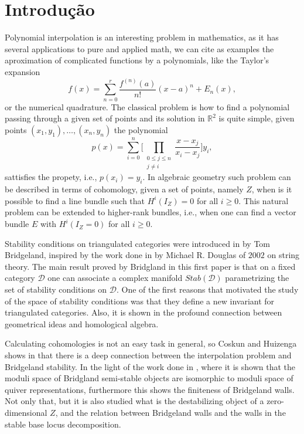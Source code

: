 \chapter*[Introdução]{Introdução}

Polynomial interpolation is an interesting problem in mathematics, as it has several applications to pure and applied math, we can cite as examples the aproximation of complicated functions by a polynomials, like the Taylor's expansion $$
f(x)=\sum_{n=0}^{r}\frac{f^{(n)}(a)}{n!}(x-a)^n+E_n(x),
$$ or the numerical quadrature. The classical problem is how to find a polynomial passing through a given set of points and its solution in $\mathbb R^2$ is quite simple, given points $(x_1,y_1),\dots,(x_n,y_n)$ the polynomial $$
p(x)=\sum_{i=0}^n\bigg[\prod_{\substack{0\le j\le n\\j\neq i}}\frac{x-x_j}{x_i-x_j}\bigg]y_i,
$$ sattisfies the propety, i.e., $p(x_i)=y_i$. In algebraic geometry such problem can be described in terms of cohomology, given a set of points, namely $Z$, when is it possible to find a line bundle such that $H^i(I_Z)=0$ for all $i\geq 0$. This natural problem can be extended to higher-rank bundles, i.e., when one can find a vector bundle $E$ with $H^i(I_Z=0)$ for all $i\geq 0$. 

Stability conditions on triangulated categories were introduced in \cite{Bridgeland} by Tom Bridgeland, inspired by the work done in \cite{Douglas:2002fj} by Michael R. Douglas of $2002$ on string theory. The main result proved by Bridgland in this first paper is that on a fixed category $\mathcal D$ one can associate a complex manifold $Stab(\mathcal D)$ parametrizing the set of stability conditions on $\mathcal D$. One of the first reasons that motivated the study of the space of stability conditions was that they define a new invariant for triangulated categories. Also, it is shown in \cite{bridgeland2008} the profound connection between geometrical ideas and homological algebra. 

Calculating cohomologies is not an easy task in general, so Coskun and Huizenga shows in \cite{COSKUN} that there is a deep connection between the interpolation problem and Bridgeland stability. In the light of the work done in \cite{ARCARA2013580}, where it is shown that the moduli space of Bridgland semi-stable objects are isomorphic to moduli space of quiver representations, furthermore this shows the finiteness of Bridgeland walls. Not only that, but it is also studied what is the destabilizing object of a zero-dimensional $Z$, and the relation between Bridgeland walls and the walls in the stable base locus decomposition. 

